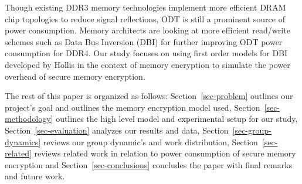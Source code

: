 Though existing DDR3 memory technologies implement more efficient DRAM chip
topologies to reduce signal reflections, ODT is still a prominent source of
power consumption. Memory architects are looking at more efficient read/write
schemes such as Data Bus Inversion (DBI) for further improving ODT power
consumption for DDR4. Our study focuses on using first order models for DBI
developed by Hollis \cite{hollis} in the context of memory encryption to
simulate the power overhead of secure memory encryption. 

The rest of this paper is organized as follows: Section~\ref{sec-problem}
outlines our project's goal and outlines the memory encryption model used,
Section~\ref{sec-methodology} outlines the high level model and experimental
setup for our study, Section~\ref{sec-evaluation} analyzes our results and
data, Section~\ref{sec-group-dynamics} reviews our group dynamic's and work
distribution, Section~\ref{sec-related} reviews related work in relation to
power consumption of secure memory encryption and Section~\ref{sec-conclusions}
concludes the paper with final remarks and future work.
